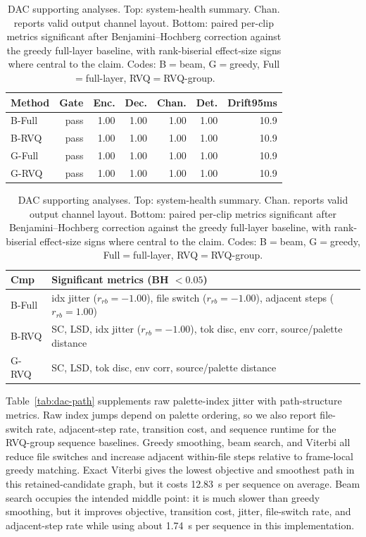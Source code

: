 \documentclass[twoside,a4paper]{article}
\begin{document}
\begin{table}[!t]
    \centering
    \scriptsize
    \caption{DAC supporting analyses. Top: system-health summary. Chan. reports valid output channel layout. Bottom: paired per-clip metrics significant after Benjamini--Hochberg correction against the greedy full-layer baseline, with rank-biserial effect-size signs where central to the claim. Codes: B$=$beam, G$=$greedy, Full$=$full-layer, RVQ$=$RVQ-group.}
    \label{tab:dac-support}
    \setlength{\tabcolsep}{2.2pt}
    \begin{tabular}{lrrrrrr}
    \toprule
    Method & Gate & Enc. & Dec. & Chan. & Det. & Drift95ms \\
    \midrule
    B-Full & pass & 1.00 & 1.00 & 1.00 & 1.00 & 10.9 \\
    B-RVQ & pass & 1.00 & 1.00 & 1.00 & 1.00 & 10.9 \\
    G-Full & pass & 1.00 & 1.00 & 1.00 & 1.00 & 10.9 \\
    G-RVQ & pass & 1.00 & 1.00 & 1.00 & 1.00 & 10.9 \\
    \bottomrule
    \end{tabular}

    \vspace{0.35em}
    \setlength{\tabcolsep}{2pt}
    \begin{tabular}{p{}p{}}
    \toprule
    Cmp & Significant metrics (BH $< 0.05$) \\
    \midrule
    B-Full & idx jitter ($r_{rb}=-1.00$), file switch ($r_{rb}=-1.00$), adjacent steps ($r_{rb}=1.00$) \\
    B-RVQ & SC, LSD, idx jitter ($r_{rb}=-1.00$), tok disc, env corr, source/palette distance \\
    G-RVQ & SC, LSD, tok disc, env corr, source/palette distance \\
    \bottomrule
    \end{tabular}
\end{table}

Table~\ref{tab:dac-path} supplements raw palette-index jitter with path-structure metrics. Raw index jumps depend on palette ordering, so we also report file-switch rate, adjacent-step rate, transition cost, and sequence runtime for the RVQ-group sequence baselines. Greedy smoothing, beam search, and Viterbi all reduce file switches and increase adjacent within-file steps relative to frame-local greedy matching. Exact Viterbi gives the lowest objective and smoothest path in this retained-candidate graph, but it costs 12.83~s per sequence on average. Beam search occupies the intended middle point: it is much slower than greedy smoothing, but it improves objective, transition cost, jitter, file-switch rate, and adjacent-step rate while using about 1.74~s per sequence in this implementation.
\end{document}
